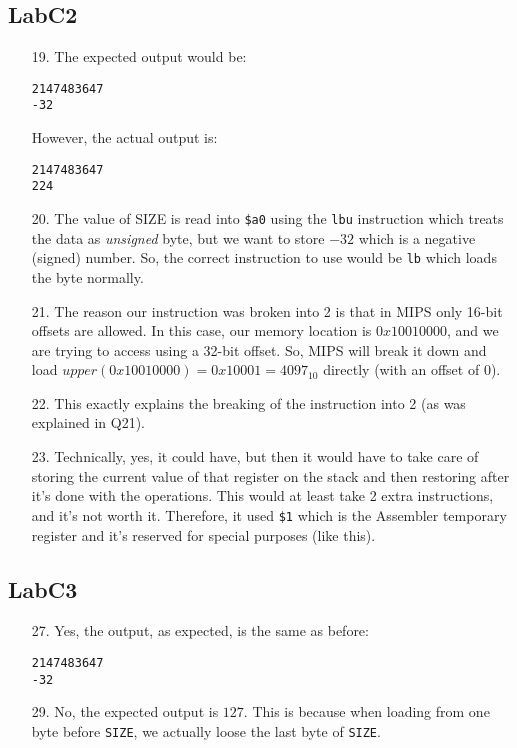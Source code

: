 \documentclass{article}
\begin{document}
\subsection{LabC2}
\begin{enumerate}
\item[19. ] The expected output would be:
\begin{verbatim}
2147483647
-32
\end{verbatim}

However, the actual output is:
\begin{verbatim}
2147483647
224
\end{verbatim}

\item[20. ] The value of SIZE is read into \verb#$a0# using the \verb$lbu$ instruction which treats the data as \textit{unsigned} byte, but we want to store $-32$ which is a negative (signed) number. So, the correct instruction to use would be \verb$lb$ which loads the byte normally.

\item[21. ] The reason our instruction was broken into 2 is that in MIPS only 16-bit offsets are allowed. In this case, our memory location is $0x10010000$, and we are trying to access using a 32-bit offset. So, MIPS will break it down and load $upper(0x10010000) = 0x10001 = 4097_{10}$ directly (with an offset of 0).

\item[22. ] This exactly explains the breaking of the instruction into 2 (as was explained in Q21).

\item[23. ] Technically, yes, it could have, but then it would have to take care of storing the current value of that register on the stack and then restoring after it's done with the operations. This would at least take 2 extra instructions, and it's not worth it. Therefore, it used \verb#$1# which is the Assembler temporary register and it's reserved for special purposes (like this).
\end{enumerate}

\subsection{LabC3}
\begin{enumerate}
\item[27. ] Yes, the output, as expected, is the same as before:
\begin{verbatim}
2147483647
-32
\end{verbatim}

\item[29. ] No, the expected output is $127$. This is because when loading from one byte before \verb$SIZE$, we actually loose the last byte of \verb$SIZE$.
\end{enumerate}
\end{document}
